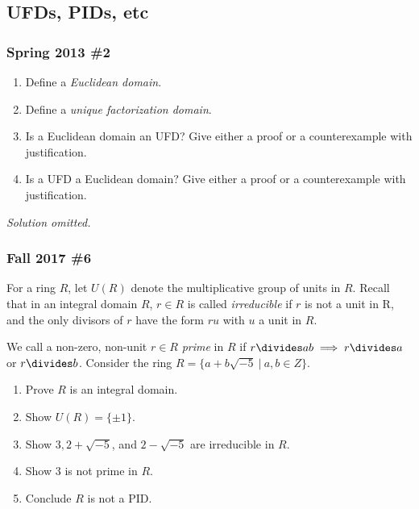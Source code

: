 \hypertarget{ufds-pids-etc}{%
\subsection{UFDs, PIDs, etc}\label{ufds-pids-etc}}

\hypertarget{spring-2013-2}{%
\subsubsection{Spring 2013 \#2}\label{spring-2013-2}}

\begin{enumerate}
\def\labelenumi{\alph{enumi}.}
\item
  Define a \emph{Euclidean domain}.
\item
  Define a \emph{unique factorization domain}.
\item
  Is a Euclidean domain an UFD? Give either a proof or a counterexample
  with justification.
\item
  Is a UFD a Euclidean domain? Give either a proof or a counterexample
  with justification.
\end{enumerate}

\emph{Solution omitted.}

\hypertarget{fall-2017-6}{%
\subsubsection{Fall 2017 \#6}\label{fall-2017-6}}

For a ring \(R\), let \(U(R)\) denote the multiplicative group of units
in \(R\). Recall that in an integral domain \(R\), \(r \in R\) is called
\emph{irreducible} if \(r\) is not a unit in R, and the only divisors of
\(r\) have the form \(ru\) with \(u\) a unit in \(R\).

We call a non-zero, non-unit \(r \in R\) \emph{prime} in \(R\) if
\(r \divides ab \implies r \divides a\) or \(r \divides b\). Consider
the ring \(R = \{a + b \sqrt{-5}{~\mathrel{\Big\vert}~}a, b \in Z\}\).

\begin{enumerate}
\def\labelenumi{\alph{enumi}.}
\item
  Prove \(R\) is an integral domain.
\item
  Show \(U(R) = \{\pm1\}\).
\item
  Show \(3, 2 + \sqrt{-5}\), and \(2 - \sqrt{-5}\) are irreducible in
  \(R\).
\item
  Show 3 is not prime in \(R\).
\item
  Conclude \(R\) is not a PID.
\end{enumerate}

